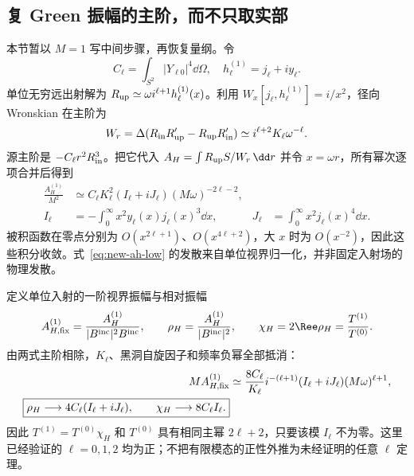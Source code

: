 \subsection{复 Green 振幅的主阶，而不只取实部}
本节暂以 $M=1$ 写中间步骤，再恢复量纲。令
\begin{equation}
 C_\ell=\int_{S^2}|Y_{\ell0}|^4\dd\Omega,
 \quad h_\ell^{(1)}=j_\ell+i y_\ell.
\end{equation}
单位无穷远出射解为 $R_{\rm up}\simeq\omega i^{\ell+1}h_\ell^{(1)}(x)$。利用
$W_x[j_\ell,h_\ell^{(1)}]=i/x^2$，径向 Wronskian 在主阶为
\begin{equation}
 W_r=\Delta(R_{\rm in}R'_{\rm up}-R_{\rm up}R'_{\rm in})
 \simeq i^{\ell+2}K_\ell\omega^{-\ell}.
\end{equation}
源主阶是 $-C_\ell r^2R_{\rm in}^3$。把它代入 $A_H=\int R_{\rm up}S/W_r\,\dd r$ 并令 $x=\omega r$，所有幂次逐项合并后得到
\begin{align}
 \frac{A_H^{(1)}}{M^2}&\simeq C_\ell K_\ell^2
 (I_\ell+iJ_\ell)(M\omega)^{-2\ell-2},\label{eq:new-ah-low}\\
 I_\ell&=-\int_0^\infty x^2 y_\ell(x)j_\ell(x)^3\dd x,
 &J_\ell&=\int_0^\infty x^2j_\ell(x)^4\dd x.
\end{align}
被积函数在零点分别为 $O(x^{2\ell+1})$、$O(x^{4\ell+2})$，大 $x$ 时为 $O(x^{-2})$，因此这些积分收敛。式~\eqref{eq:new-ah-low} 的发散来自单位视界归一化，并非固定入射场的物理发散。

定义单位入射的一阶视界振幅与相对振幅
\begin{equation}
 A_{H,\rm fix}^{(1)}=\frac{A_H^{(1)}}{|B^{\rm inc}|^2B^{\rm inc}},\qquad
 \rho_H=\frac{A_H^{(1)}}{|B^{\rm inc}|^2},\qquad
 \chi_H=2\Ree\rho_H=\frac{T^{(1)}}{T^{(0)}}.
\end{equation}
由两式主阶相除，$K_\ell$、黑洞自旋因子和频率负幂全部抵消：
\begin{align}
 M A_{H,\rm fix}^{(1)}&\simeq\frac{8C_\ell}{K_\ell}
 i^{-(\ell+1)}(I_\ell+iJ_\ell)(M\omega)^{\ell+1},\\
 \boxed{\rho_H\longrightarrow4C_\ell(I_\ell+iJ_\ell),\qquad
 \chi_H\longrightarrow8C_\ell I_\ell.}\label{eq:new-rho-limit}
\end{align}
因此 $T^{(1)}=T^{(0)}\chi_H$ 和 $T^{(0)}$ 具有相同主幂 $2\ell+2$，只要该模 $I_\ell$ 不为零。这里已经验证的 $\ell=0,1,2$ 均为正；不把有限模态的正性外推为未经证明的任意 $\ell$ 定理。

